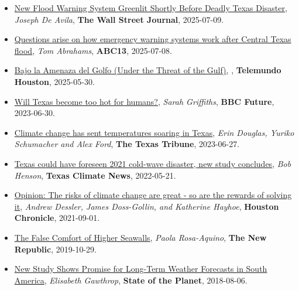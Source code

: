\documentclass[10pt,oneside]{article}
\begin{document}
\begin{itemize}[label={}]
  \item \href{https://www.wsj.com/us-news/climate-environment/texas-guadalupe-flood-threat-system-06c29954}{New Flood Warning System Greenlit Shortly Before Deadly Texas Disaster}, \textit{Joseph De Avila}, \textbf{The Wall Street Journal}, 2025-07-09.
        
  \item \href{https://abc13.com/post/questions-arise-how-emergency-warning-systems-work-central-texas-flood/17024010/}{Questions arise on how emergency warning systems work after Central Texas flood}, \textit{Tom Abrahams}, \textbf{ABC13}, 2025-07-08.
        
  \item \href{https://www.telemundohouston.com/noticias/bajo-la-amenaza-del-golfo-parte-1-2/2494095/}{Bajo la Amenaza del Golfo (Under the Threat of the Gulf)}, \textit{}, \textbf{Telemundo Houston}, 2025-05-30.
        
  \item \href{https://www.bbc.com/future/article/20230630-will-texas-become-too-hot-for-humans}{Will Texas become too hot for humans?}, \textit{Sarah Griffiths}, \textbf{BBC Future}, 2023-06-30.
        
  \item \href{https://www.texastribune.org/2023/06/27/texas-climate-change-heat/}{Climate change has sent temperatures soaring in Texas}, \textit{Erin Douglas, Yuriko Schumacher and Alex Ford}, \textbf{The Texas Tribune}, 2023-06-27.
        
  \item \href{https://texasclimatenews.org/2022/05/21/texas-could-have-foreseen-2021-cold-wave-disaster-new-study-concludes/}{Texas could have foreseen 2021 cold-wave disaster, new study concludes}, \textit{Bob Henson}, \textbf{Texas Climate News}, 2022-05-21.
        
  \item \href{https://www.houstonchronicle.com/opinion/outlook/article/Opinion-The-risks-of-climate-change-are-great-16426616.php}{Opinion: The risks of climate change are great - so are the rewards of solving it}, \textit{Andrew Dessler, James Doss-Gollin, and Katherine Hayhoe}, \textbf{Houston Chronicle}, 2021-09-01.
        
  \item \href{https://newrepublic.com/article/155519/false-comfort-higher-seawalls}{The False Comfort of Higher Seawalls}, \textit{Paola Rosa-Aquino}, \textbf{The New Republic}, 2019-10-29.
        
  \item \href{https://blogs.ei.columbia.edu/2018/08/06/subseasonal-weather-forecasts-paraguay/}{New Study Shows Promise for Long-Term Weather Forecasts in South America}, \textit{Elisabeth Gawthrop}, \textbf{State of the Planet}, 2018-08-06.
        
\end{itemize}
\end{document}
